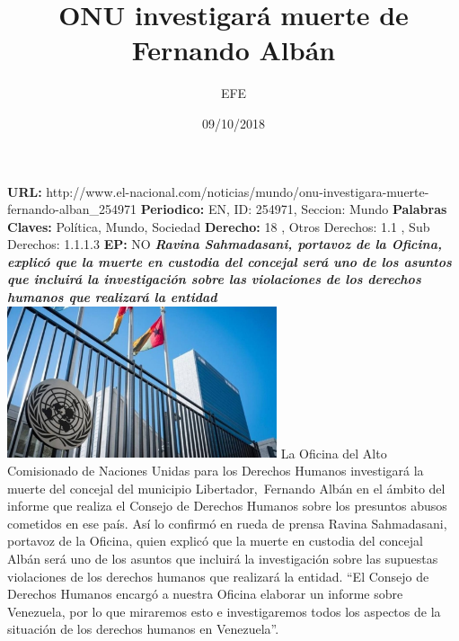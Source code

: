 \documentclass{article}%
\title{\textbf{ONU investigará muerte de Fernando Albán}}%
\author{EFE}%
\date{09/10/2018}%
\begin{document}
%
\normalsize%
\maketitle%
\textbf{URL: }%
http://www.el{-}nacional.com/noticias/mundo/onu{-}investigara{-}muerte{-}fernando{-}alban\_254971\newline%
%
\textbf{Periodico: }%
EN, %
ID: %
254971, %
Seccion: %
Mundo\newline%
%
\textbf{Palabras Claves: }%
Política, Mundo, Sociedad\newline%
%
\textbf{Derecho: }%
18%
, Otros Derechos: %
1.1%
, Sub Derechos: %
1.1.1.3%
\newline%
%
\textbf{EP: }%
NO\newline%
\newline%
%
\textbf{\textit{Ravina Sahmadasani, portavoz de la Oficina, explicó que la muerte en custodia del concejal será uno de los asuntos que incluirá la investigación sobre las violaciones de los derechos humanos que realizará la entidad}}%
\newline%
\newline%
%
\includegraphics[width=300px]{134.jpg}%
\newline%
%
La Oficina del Alto Comisionado de Naciones Unidas para los Derechos Humanos investigará la muerte del concejal del municipio Libertador,~Fernando Albán en el ámbito del informe que realiza el Consejo de Derechos Humanos sobre los presuntos abusos cometidos en ese país.%
\newline%
%
Así lo confirmó en rueda de prensa Ravina Sahmadasani, portavoz de la Oficina, quien explicó que la muerte en custodia del concejal Albán será uno de los asuntos que incluirá la investigación sobre las supuestas violaciones de los derechos humanos que realizará la entidad.%
\newline%
%
“El Consejo de Derechos Humanos encargó a nuestra Oficina elaborar un informe sobre Venezuela, por lo que miraremos esto e investigaremos todos los aspectos de la situación de los derechos humanos en Venezuela”.%
\newline%
\end{document}

